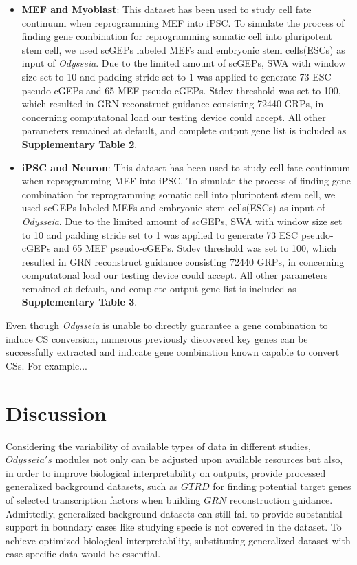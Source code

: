 \documentclass[fleqn,10pt]{wlscirep}
\begin{document}
\begin{itemize}
\item \textbf{MEF and Myoblast}:
This dataset has been used to study cell fate continuum when reprogramming MEF into iPSC.\cite{mef_iMPC_ETH}
To simulate the process of finding gene combination for reprogramming somatic cell into pluripotent stem cell, we used scGEPs labeled MEFs and embryonic stem cells(ESCs) as input of \emph{Odysseia}.
Due to the limited amount of scGEPs, SWA with window size set to 10 and padding stride set to 1 was applied to generate 73 ESC pseudo-cGEPs and 65 MEF pseudo-cGEPs.
Stdev threshold was set to 100, which resulted in GRN reconstruct guidance consisting 72440 GRPs, in concerning computatonal load our testing device could accept.
All other parameters remained at default, and complete output gene list is included as \textbf{Supplementary Table 2}.
\item \textbf{iPSC and Neuron}:
This dataset has been used to study cell fate continuum when reprogramming MEF into iPSC.\cite{ips_neuron_ascl1}
To simulate the process of finding gene combination for reprogramming somatic cell into pluripotent stem cell, we used scGEPs labeled MEFs and embryonic stem cells(ESCs) as input of \emph{Odysseia}.
Due to the limited amount of scGEPs, SWA with window size set to 10 and padding stride set to 1 was applied to generate 73 ESC pseudo-cGEPs and 65 MEF pseudo-cGEPs.
Stdev threshold was set to 100, which resulted in GRN reconstruct guidance consisting 72440 GRPs, in concerning computatonal load our testing device could accept.
All other parameters remained at default, and complete output gene list is included as \textbf{Supplementary Table 3}.
\end{itemize}

Even though \emph{Odysseia} is unable to directly guarantee a gene combination to induce CS conversion, numerous previously discovered key genes can be successfully extracted and indicate gene combination known capable to convert CSs.
For example...\cite{ips7f}

\section*{Discussion}
\label{disc}
Considering the variability of available types of data in different studies, $Odysseia's$ modules not only can be adjusted upon available resources but also, in order to improve biological interpretability on outputs, provide processed generalized background datasets, such as $GTRD$\cite{gkaa1057} for finding potential target genes of selected transcription factors when building $GRN$ reconstruction guidance. Admittedly, generalized background datasets can still fail to provide substantial support in boundary cases like studying specie is not covered in the dataset. To achieve optimized biological interpretability, substituting generalized dataset with case specific data would be essential.
\end{document}

